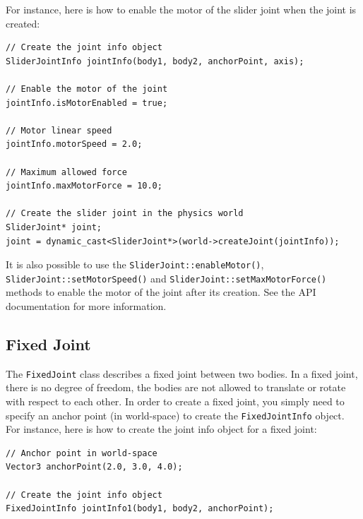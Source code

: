\documentclass[a4paper,12pt]{article}
\begin{document}
     For instance, here is how to enable the motor of the slider joint when the joint is created: \\

     \begin{lstlisting}
// Create the joint info object
SliderJointInfo jointInfo(body1, body2, anchorPoint, axis);

// Enable the motor of the joint
jointInfo.isMotorEnabled = true;

// Motor linear speed
jointInfo.motorSpeed = 2.0;

// Maximum allowed force
jointInfo.maxMotorForce = 10.0;

// Create the slider joint in the physics world
SliderJoint* joint;
joint = dynamic_cast<SliderJoint*>(world->createJoint(jointInfo));
  \end{lstlisting}

     \vspace{0.6cm}

     \begin{sloppypar}
        It is also possible to use the \texttt{SliderJoint::enableMotor()}, \texttt{SliderJoint::setMotorSpeed()} and \texttt{SliderJoint::setMaxMotorForce()} methods to enable the
        motor of the joint after its creation. See the API documentation for more information.
     \end{sloppypar}

    \subsection{Fixed Joint}

    The \texttt{FixedJoint} class describes a fixed joint between two bodies. In a fixed joint, there is no degree of freedom, the bodies are not allowed to translate
    or rotate with respect to each other. In order to create a fixed joint, you simply need to specify an anchor point (in world-space) to create the \texttt{FixedJointInfo}
    object. \\

    For instance, here is how to create the joint info object for a fixed joint: \\

    \begin{lstlisting}
// Anchor point in world-space
Vector3 anchorPoint(2.0, 3.0, 4.0);

// Create the joint info object
FixedJointInfo jointInfo1(body1, body2, anchorPoint);
  \end{lstlisting}
\end{document}
